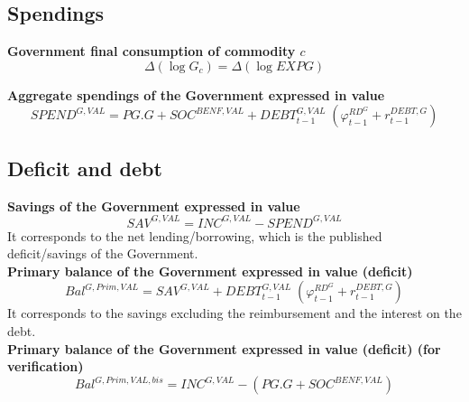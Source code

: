 \documentclass[12pt]{article}
\numberwithin{equation}{section}
\begin{document}
\subsection{Spendings}



\noindent \textbf{ Government final consumption of commodity $c$} 
\begin{dmath}
\varDelta \left(\operatorname{log} G_{c}\right) = \varDelta \left(\operatorname{log} EXPG\right)
\label{government.mdlG[c]}
\end{dmath}

\noindent \textbf{Aggregate spendings of the Government expressed in value} 
\begin{dmath}
SPEND^{G,VAL} = PG . G + SOC^{BENF,VAL} + DEBT^{G,VAL}_{t-1} \; \left( \varphi^{RD^{G}}_{t-1} + r^{DEBT,G}_{t-1} \right)
\label{government.mdlSPEND_G_VAL}
\end{dmath}



\subsection{Deficit and debt}



\noindent \textbf{Savings of the Government expressed in value} 
\begin{dmath}
SAV^{G,VAL} = INC^{G,VAL} - SPEND^{G,VAL}
\label{government.mdlSAV_G_VAL}
\end{dmath}
It corresponds to the net lending/borrowing, which is the published deficit/savings of the Government. \\

\noindent \textbf{Primary balance of the Government expressed in value (deficit)} 
\begin{dmath}
Bal^{G,Prim,VAL} = SAV^{G,VAL} + DEBT^{G,VAL}_{t-1} \; \left( \varphi^{RD^{G}}_{t-1} + r^{DEBT,G}_{t-1} \right)
\label{government.mdlBal_G_Prim_VAL}
\end{dmath}
It corresponds to the savings excluding the reimbursement and the interest on the debt. \\

\noindent \textbf{Primary balance of the Government expressed in value (deficit) (for verification)} 
\begin{dmath}
Bal^{G,Prim,VAL,bis} = INC^{G,VAL} - \left( PG . G + SOC^{BENF,VAL} \right)
\label{government.mdlBal_G_Prim_VALbis}
\end{dmath}
\end{document}
